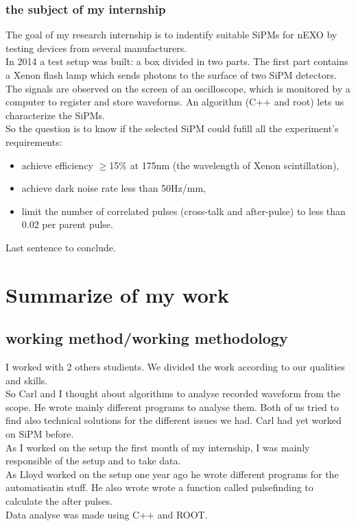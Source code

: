 \documentclass[a4paper, 11pt]{report}%
\newcommand{\xfl}{Xenon flash lamp }
\begin{document}
  \subsection{the subject of my internship}
  
  
  The goal of my research internship is to indentify suitable SiPMs for nEXO by testing devices from several manufacturers.\\
  In 2014 a test setup was built: a box divided in two parts. 
  The first part contains a \xfl which sends photons to the surface of two SiPM detectors. The signals are observed 
  on the screen of an oscilloscope, which is monitored by a computer to register and store waveforms. 
  An algorithm (C++ and root) lets us characterize the SiPMs.
  \\
  
  So the question is to know if the selected SiPM could fufill all the experiment's requirements: 
  
  \begin{itemize}
  \item  achieve efficiency \(\geq\)15\% at 175nm (the wavelength of Xenon scintillation), 
  \item achieve dark noise rate less than 50Hz/mm\texttwosuperior{}, 
  \item limit the number of correlated pulses (cross-talk and after-pulse) to less than 0.02 per parent pulse.
  \end{itemize}
  
  Last sentence to conclude.

\chapter{Summarize of my work}
  
  \section{working method/working methodology}
  
  I worked with 2 others studients.  We divided the work according to our qualities and skills.
  \\
  
  So Carl and I thought about algorithms to analyse recorded waveform from the scope. He wrote mainly different programs to analyse them.
  Both of us tried to find also technical solutions for the different issues we had. Carl had yet worked on SiPM before. \\
  As I worked on the setup the first month of my internship, I was mainly responsible of the setup and to take data.\\
  As Lloyd worked on the setup one year ago he wrote different programs for the automatisatin stuff. He also wrote wrote a function called 
  pulsefinding to calculate the after pulses.\\
  Data analyse was made using C++ and ROOT. 
  \\
  
\end{document}

